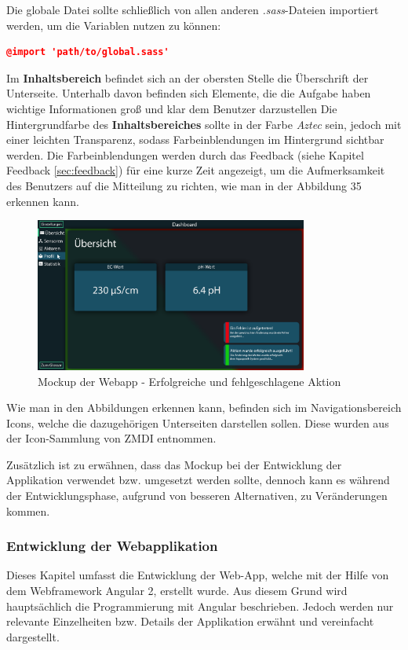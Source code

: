 Die globale Datei sollte schließlich von allen anderen \textit{.sass}-Dateien importiert werden, um die Variablen nutzen zu können:
\begin{lstlisting}[language=json]
@import 'path/to/global.sass'
\end{lstlisting}
\lstset{escapechar=@,style=customjava}

Im \textbf{Inhaltsbereich} befindet sich an der obersten Stelle die Überschrift der Unterseite. Unterhalb davon befinden sich Elemente, die die Aufgabe haben wichtige Informationen groß und klar dem Benutzer darzustellen
Die Hintergrundfarbe des \textbf{Inhaltsbereiches} sollte in der Farbe \textit{Aztec} sein, jedoch mit einer leichten Transparenz, sodass Farbeinblendungen im Hintergrund sichtbar werden. Die Farbeinblendungen werden durch das Feedback (siehe Kapitel Feedback \ref{sec:feedback}) für eine kurze Zeit angezeigt, um die Aufmerksamkeit des Benutzers auf die Mitteilung zu richten, wie man in der Abbildung 35 erkennen kann.

\begin{figure}[ht]
    \centering
	\includegraphics[width=0.8\textwidth]{images/webapp-mockup-success-error}
	\caption{Mockup der Webapp - Erfolgreiche und fehlgeschlagene Aktion}
\end{figure}

Wie man in den Abbildungen erkennen kann, befinden sich im Navigationsbereich Icons, welche die dazugehörigen Unterseiten darstellen sollen. Diese wurden aus der Icon-Sammlung von ZMDI entnommen. \cite{zmdi}

Zusätzlich ist zu erwähnen, dass das Mockup bei der Entwicklung der Applikation verwendet bzw. umgesetzt werden sollte, dennoch kann es während der Entwicklungsphase, aufgrund von besseren Alternativen, zu Veränderungen kommen.

\subsubsection{Entwicklung der Webapplikation}
Dieses Kapitel umfasst die Entwicklung der Web-App, welche mit der Hilfe von dem Webframework Angular 2, erstellt wurde. Aus diesem Grund wird hauptsächlich die Programmierung mit Angular beschrieben. Jedoch werden nur relevante Einzelheiten bzw. Details der Applikation erwähnt und vereinfacht dargestellt.


